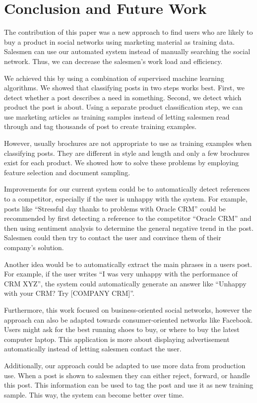 \section{Conclusion and Future Work}
\label{sec:conclusion}

The contribution of this paper was a new approach to find users who are likely to buy a product in social networks using marketing material as training data.
Salesmen can use our automated system instead of manually searching the social network.
Thus, we can decrease the salesmen's work load and efficiency.

We achieved this by using a combination of supervised machine learning algorithms.
We showed that classifying posts in two steps works best. 
First, we detect whether a post describes a need in something.
Second, we detect which product the post is about.
Using a separate product classification step, we can use marketing articles as training samples instead of letting salesmen read through and tag thousands of post to create training examples.

However, usually brochures are not appropriate to use as training examples when classifying posts.
They are different in style and length and only a few brochures exist for each product.
We showed how to solve these problems by employing feature selection and document sampling.

Improvements for our current system could be to automatically detect references to a competitor, especially if the user is unhappy with the system.
For example, posts like ``Stressful day thanks to problems with Oracle CRM'' could be recommended by first detecting a reference to the competitor ``Oracle CRM'' and then using sentiment analysis to determine the general negative trend in the post.
Salesmen could then try to contact the user and convince them of their company's solution.

Another idea would be to automatically extract the main phrases in a users post.
For example, if the user writes ``I was very unhappy with the performance of CRM XYZ'', the system could automatically generate an answer like ``Unhappy with your CRM? Try [COMPANY CRM]''.

Furthermore, this work focused on business-oriented social networks, however the approach can also be adapted towards consumer-oriented networks like Facebook.
Users might ask for the best running shoes to buy, or where to buy the latest computer laptop.
This application is more about displaying advertisement automatically instead of letting salesmen contact the user.

Additionally, our approach could be adapted to use more data from production use.
When a post is shown to salesmen they can either reject, forward, or handle this post.
This information can be used to tag the post and use it as new training sample.
This way, the system can become better over time.
